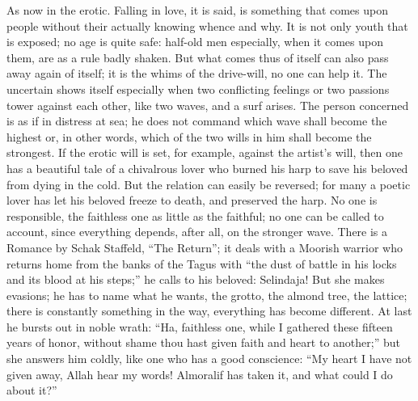 \documentclass[12pt,a4paper,openany]{book}
\newcommand{\opage}[1]{\marginnote{\footnotesize\textit{[#1]}}}
\begin{document}
As now in the erotic. Falling in love, it is said, is
something that comes upon people without their actually knowing
whence and why. It is not only youth that is
exposed; no age is quite safe: half-old men especially,
when it comes upon them, are as a rule badly shaken.
But what comes thus of itself can also pass
away again of itself; it is the whims of the drive-will, no one
can help it. The uncertain shows itself especially when two
conflicting feelings or two passions tower against each other,
like two waves, and a surf arises.
The person concerned is as if in distress at sea; he does not command
which wave shall become the highest or, in other
words, which of the two wills in him shall become the
strongest. If the erotic will is set, for example, against the artist's will,
then one has a beautiful tale of a chivalrous
\setcounter{footnote}{0}%
\opage{20}lover who burned his harp to save his beloved from
dying in the cold. But the relation can easily be reversed; for
many a poetic lover has let his beloved freeze to death, and
preserved the harp. No one is responsible, the faithless one as
little as the faithful; no one can be called to account, since
everything depends, after all, on the stronger wave.
There is a Romance by Schak Staffeld, ``The Return''; it deals
with a Moorish warrior who returns home from the banks of the Tagus
with ``the dust of battle in his locks and its blood at his
steps;'' he calls to his beloved: Selindaja! But she
makes evasions; he has to name what he wants, the grotto,
the almond tree, the lattice; there is constantly something in the way, everything
has become different. At last he bursts out in noble wrath:
``Ha, faithless one, while I gathered these fifteen years of honor, without
shame thou hast given faith and heart to another;'' but she
answers him coldly, like one who has a good conscience:
``My heart I have not given away, Allah hear my words! Almoralif
has taken it, and what could I do about it?''
\end{document}
